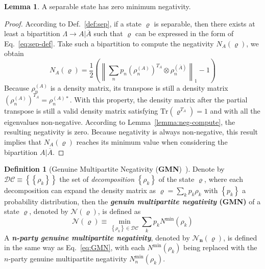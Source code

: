 \documentclass[12font]{article}
\theoremstyle{definition}
\newtheorem{definition}{Definition}[section]
\newtheorem{lemma}[theorem]{Lemma}
\newcommand{\lr}[1]{\left(  #1  \right)}
\newcommand{\lrg}[1]{\left\{  #1  \right\}}
\newcommand{\mrm}[1]{\mathrm{#1}}
\newcommand{\Tr}{\mrm{Tr}}
\newcommand{\norm}[1]{\left\lVert#1\right\rVert}
\begin{document}
\begin{lemma}\label{lemma:sep-zero-neg}
    A separable state has zero minimum negativity.
\end{lemma}
\begin{proof}
    According to Def.~\ref{def:sep}, if a state $\varrho$ is separable, then there exists at least a bipartition $\Lambda \to A|\overline{A}$ such that $\varrho$ can be expressed in the form of Eq.~\eqref{eq:sep-def}. Take such a bipartition to compute the negativity $N_A(\varrho)$, we obtain
    \[
    N_A(\varrho) = \frac{1}{2}
    \lr{
        \norm{
            \sum_{n} p_n 
            \lr{\rho^{(A)}_n}^{T_A}
            \otimes 
            \rho^{(\overline{A})}_n
        }_1 
        - 
        1
    }
    \]
    Because $\rho^{(A)}_n$ is a density matrix, its transpose is still a density matrix $    \lr{\rho^{(A)}_n}^{T_A}
    =
    \rho^{(A)*}_n$. With this property, the density matrix after the partial transpose is still a valid density matrix satisfying $\Tr\lr{\varrho^{T_A}} = 1$ and with all the eigenvalues non-negative. According to Lemma~\ref{lemma:neg-compute}, the resulting negativity is zero. Because negativity is always non-negative, this result implies that $  N_A(\varrho)  $ reaches its minimum value when considering the bipartition $A|\overline{A}$.
\end{proof}

\begin{definition}[Genuine Multipartite Negativity (\textbf{GMN})~\cite{Lyu-Chandorkar-Kapoor-Takei-Sorensen-Witczak-Krempa_2026}]\label{def:GMN_1}
    Denote by $\mathcal{DC} \equiv \lrg{\lrg{\rho_k}}$ the set of \textit{decomposition} $\lrg{\rho_k}$ of the state $\varrho$, where each decomposition can expand the density matrix as $\varrho = \sum_{k}p_k\rho_k$ with $\lrg{p_k}$ a probability distribution, then the \textbf{\textit{genuin multipartite negativity} (GMN)} of a state $\varrho$, denoted by $\mathcal{N}(\varrho)$, is defined as 
    \begin{equation}\label{eq:GMN}
        \mathcal{N}(\varrho) \equiv \min_{\lrg{\rho_k} \in \mathcal{DC}} \sum_{k}p_k N^{\mrm{min}}(\rho_k)
    \end{equation}
    A \textbf{\textit{n-party genuine multipartite negativity}}, denoted by $\boldsymbol{\mathcal{N}_n(\varrho)}$, is defined in the same way as Eq.~\eqref{eq:GMN}, with each $N^{\mrm{min}}(\rho_k)$ being replaced with the $n$-party genuine multipartite negativity $N^{\mrm{min}}_n(\rho_k)$.
\end{definition}
\end{document}
